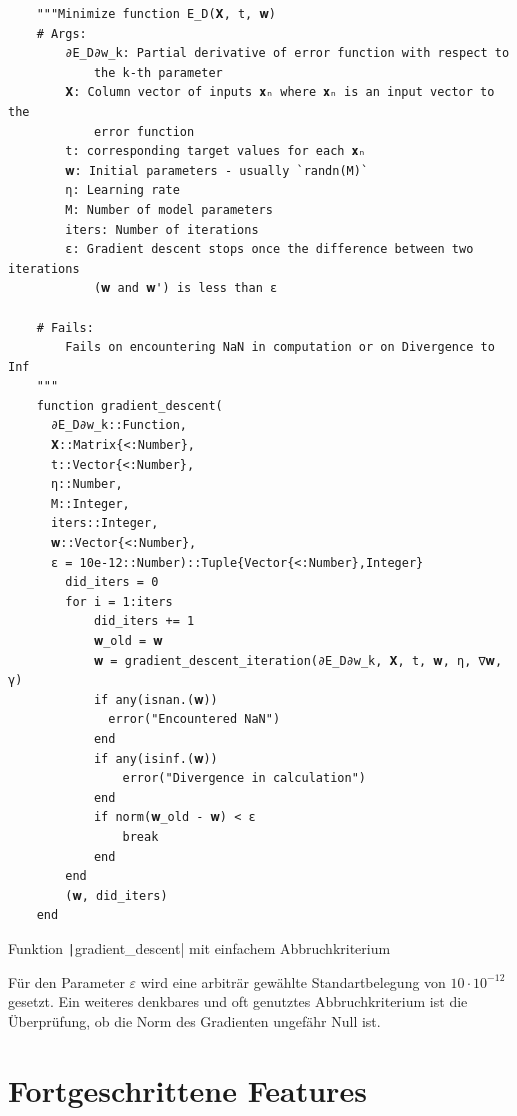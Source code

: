 \documentclass{article}
\theoremstyle{plain} %
\theoremstyle{definition} %
\begin{document}
\begin{listing}[H]
  \begin{verbatim} 
    """Minimize function E_D(𝐗, t, 𝐰)
    # Args:
        ∂E_D∂w_k: Partial derivative of error function with respect to
            the k-th parameter
        𝐗: Column vector of inputs 𝐱ₙ where 𝐱ₙ is an input vector to the
            error function
        t: corresponding target values for each 𝐱ₙ
        𝐰: Initial parameters - usually `randn(M)`
        η: Learning rate
        M: Number of model parameters
        iters: Number of iterations
        ε: Gradient descent stops once the difference between two iterations
            (𝐰 and 𝐰') is less than ε

    # Fails:
        Fails on encountering NaN in computation or on Divergence to Inf
    """
    function gradient_descent(
      ∂E_D∂w_k::Function,
      𝐗::Matrix{<:Number},
      t::Vector{<:Number},
      η::Number,
      M::Integer,
      iters::Integer,
      𝐰::Vector{<:Number},
      ε = 10e-12::Number)::Tuple{Vector{<:Number},Integer}
        did_iters = 0
        for i = 1:iters
            did_iters += 1
            𝐰_old = 𝐰
            𝐰 = gradient_descent_iteration(∂E_D∂w_k, 𝐗, t, 𝐰, η, ∇𝐰, γ)
            if any(isnan.(𝐰))
              error("Encountered NaN") 
            end
            if any(isinf.(𝐰))
                error("Divergence in calculation")
            end
            if norm(𝐰_old - 𝐰) < ε
                break
            end
        end
        (𝐰, did_iters)
    end
  \end{verbatim}
  \caption{Funktion \texttt|gradient_descent| mit einfachem Abbruchkriterium}
  \label{listing:simplebreak}
\end{listing}

Für den Parameter $\varepsilon$ wird eine arbiträr gewählte Standartbelegung von $10\cdot10^{-12}$ gesetzt. Ein weiteres denkbares und oft genutztes Abbruchkriterium ist die Überprüfung, ob die Norm des Gradienten ungefähr Null ist.

\section{Fortgeschrittene Features}
\end{document}
